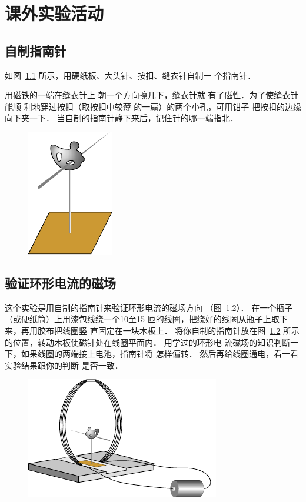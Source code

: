 \chapter{课外实验活动}

\section{自制指南针}
如图~\ref{fig_C_10-10} 所示，用硬纸板、大头针、按扣、缝衣针自制一
个指南针．

用磁铁的一端在缝衣针上
朝一个方向擦几下，缝衣针就
有了磁性．为了使缝衣针能顺
利地穿过按扣（取按扣中较薄
的一扇）的两个小孔，可用钳子
把按扣的边缘向下夹一下．
当自制的指南针静下来后，记住针的哪一端指北．

\begin{figure}[htbp]
    \centering
    \includegraphics{fig/C/10-10.pdf}
    \caption{}\label{fig_C_10-10}
\end{figure}


\section{验证环形电流的磁场}
这个实验是用自制的指南针来验证环形电流的磁场方向
（图~\ref{fig_C_10-11}）．
在一个瓶子（或硬纸筒）上用漆包线绕一个10至15
匝的线圈，把绕好的线圈从瓶子上取下来，再用胶布把线圈竖
直固定在一块木板上．
将你自制的指南针放在图~\ref{fig_C_10-11} 所示
的位置，转动木板使磁针处在线圈平面内．
用学过的环形电
流磁场的知识判断一下，如果线圈的两端接上电池，指南针将
怎样偏转．
然后再给线圈通电，看一看实验结果跟你的判断
是否一致．
\begin{figure}[htbp]
    \centering
    \includegraphics{fig/C/10-11.pdf}
    \caption{}\label{fig_C_10-11}
\end{figure}

